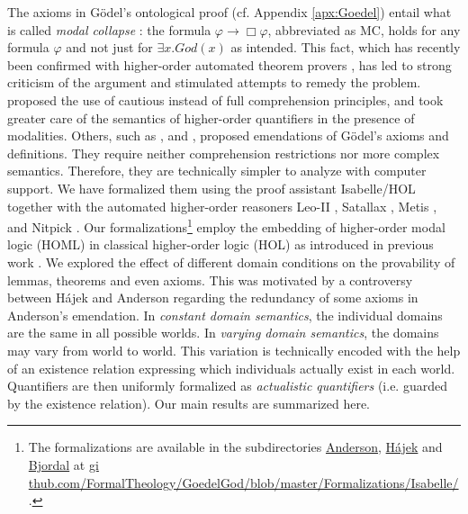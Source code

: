 \documentclass{birkjour}
\theoremstyle{definition}
\theoremstyle{remark}
\numberwithin{equation}{section}
\begin{document}
\noindent The axioms in G\"odel's ontological proof
\citep{GoedelNotes,ScottNotes} (cf. Appendix \ref{apx:Goedel}) entail
what is called \emph{modal collapse}
\citep{Sobel1987,SobelBook2004}: the formula $\varphi \rightarrow \Box
\varphi$, abbreviated as MC, holds for any formula $\varphi$ and not
just for $\exists x. \mathit{God}(x)$ as intended. This fact, which
has recently been confirmed with higher-order automated theorem
provers \citep{C40,J30}, has led to strong criticism of the argument
and stimulated attempts to remedy the problem.
\citet{Hajek_Magari_and_others_1996,Hajek_der_Mathematiker_2001}
proposed the use of cautious instead of full comprehension principles,
and \citet{fitting02:_types_tableaus_god} took
greater care of the semantics of higher-order quantifiers
in the presence of modalities. Others, such as
\citet{anderson90:_some_emend_of_goedel_ontol_proof}, \citet{Hajek2002}
and \citet{bjordal99}, proposed emendations of G\"odel's
axioms and definitions. They require neither comprehension
restrictions nor more complex semantics. Therefore, they are
technically simpler to analyze with computer support. We have
formalized them using the proof assistant Isabelle/HOL \citep{Isabelle}
together with the automated higher-order reasoners Leo-II \citep{C26},
Satallax \citep{brown2012satallax}, Metis 
\citep{Hurd03first-orderproof}, and Nitpick \citep{Nitpick}.   Our
formalizations\footnote{The   formalizations are available in the
subdirectories \url{Anderson}, \url{Hájek} and \url{Bjordal} at \url{gi
thub.com/FormalTheology/GoedelGod/blob/master/Formalizations/Isabelle/
}.} employ the embedding of higher-order modal logic (HOML) in
classical higher-order logic (HOL) as introduced in previous work
\citep{C40,J30,J23}. We explored the effect of different domain
conditions on the provability of lemmas, theorems and even axioms.
This was motivated by a controversy between Hájek and Anderson
regarding the redundancy of some axioms in Anderson's emendation. In
\emph{constant domain semantics}, the individual domains are the same
in all possible worlds. In \emph{varying domain semantics}, the
domains may vary from world to world. This variation is technically
encoded with the help of an existence relation expressing which
individuals actually exist in each world. Quantifiers are then
uniformly formalized as \emph{actualistic quantifiers} (i.e. guarded by
the existence relation). Our main results are summarized here.

\end{document}
